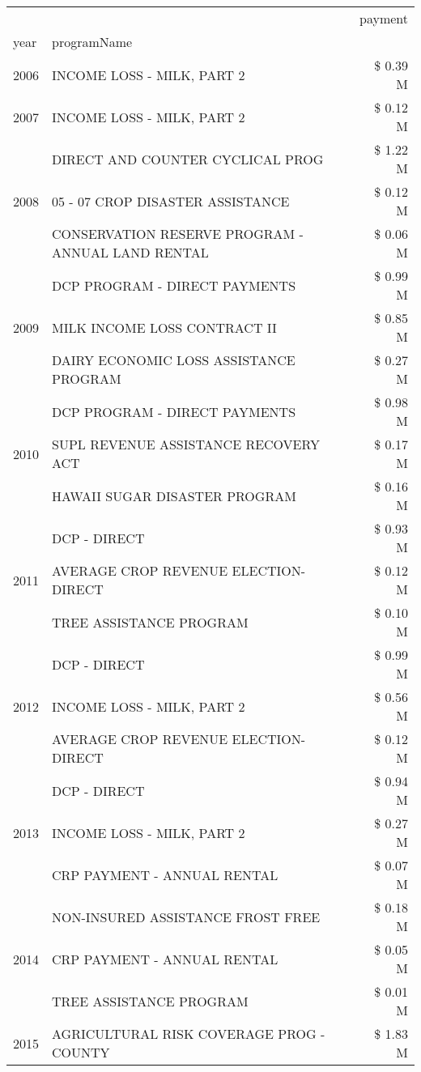 \begin{tabular}{llr}
\toprule
 &  & payment \\
year & programName &  \\
\midrule
2006 & INCOME LOSS - MILK, PART 2 & \$ 0.39 M \\
\cline{1-3}
2007 & INCOME LOSS - MILK, PART 2 & \$ 0.12 M \\
\cline{1-3}
\multirow[t]{3}{*}{2008} & DIRECT AND COUNTER CYCLICAL PROG & \$ 1.22 M \\
 & 05 - 07 CROP DISASTER ASSISTANCE & \$ 0.12 M \\
 & CONSERVATION RESERVE PROGRAM - ANNUAL LAND RENTAL & \$ 0.06 M \\
\cline{1-3}
\multirow[t]{3}{*}{2009} & DCP PROGRAM - DIRECT PAYMENTS & \$ 0.99 M \\
 & MILK INCOME LOSS CONTRACT II & \$ 0.85 M \\
 & DAIRY ECONOMIC LOSS ASSISTANCE PROGRAM & \$ 0.27 M \\
\cline{1-3}
\multirow[t]{3}{*}{2010} & DCP PROGRAM - DIRECT PAYMENTS & \$ 0.98 M \\
 & SUPL REVENUE ASSISTANCE RECOVERY ACT & \$ 0.17 M \\
 & HAWAII SUGAR DISASTER PROGRAM & \$ 0.16 M \\
\cline{1-3}
\multirow[t]{3}{*}{2011} & DCP - DIRECT & \$ 0.93 M \\
 & AVERAGE CROP REVENUE ELECTION-DIRECT & \$ 0.12 M \\
 & TREE ASSISTANCE PROGRAM & \$ 0.10 M \\
\cline{1-3}
\multirow[t]{3}{*}{2012} & DCP - DIRECT & \$ 0.99 M \\
 & INCOME LOSS - MILK, PART 2 & \$ 0.56 M \\
 & AVERAGE CROP REVENUE ELECTION-DIRECT & \$ 0.12 M \\
\cline{1-3}
\multirow[t]{3}{*}{2013} & DCP - DIRECT & \$ 0.94 M \\
 & INCOME LOSS - MILK, PART 2 & \$ 0.27 M \\
 & CRP PAYMENT - ANNUAL RENTAL & \$ 0.07 M \\
\cline{1-3}
\multirow[t]{3}{*}{2014} & NON-INSURED ASSISTANCE FROST FREE & \$ 0.18 M \\
 & CRP PAYMENT - ANNUAL RENTAL & \$ 0.05 M \\
 & TREE ASSISTANCE PROGRAM & \$ 0.01 M \\
\cline{1-3}
\multirow[t]{3}{*}{2015} & AGRICULTURAL RISK COVERAGE PROG - COUNTY & \$ 1.83 M \\

\end{tabular}
